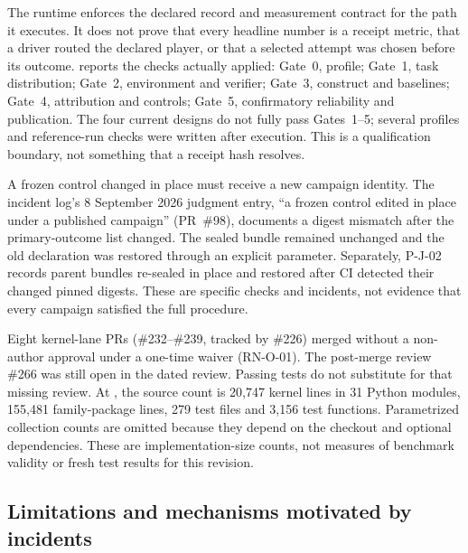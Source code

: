 The runtime enforces the declared record and measurement contract for
the path it executes. It does not prove that every headline number is
a receipt metric, that a driver routed the declared player, or that a
selected attempt was chosen before its outcome. \qcref{} reports the
checks actually applied: Gate~0, profile; Gate~1, task distribution;
Gate~2, environment and verifier; Gate~3, construct and baselines;
Gate~4, attribution and controls; Gate~5, confirmatory reliability and
publication. The four current designs do not fully pass Gates~1--5;
several profiles and reference-run checks were written after execution.
This is a qualification boundary, not something that a receipt hash
resolves.

A frozen control changed in place must receive a new campaign identity.
The incident log's 8 September 2026 judgment entry, ``a frozen control
edited in place under a published campaign'' (PR~\#98), documents a
digest mismatch after the primary-outcome list changed. The sealed
bundle remained unchanged and the old declaration was restored through
an explicit parameter. Separately, P-J-02 records parent bundles
re-sealed in place and restored after CI detected their changed pinned
digests. These are specific checks and incidents, not evidence that
every campaign satisfied the full procedure.

Eight kernel-lane PRs (\#232--\#239, tracked by \#226) merged without a
non-author approval under a one-time waiver (RN-O-01). The post-merge
review \#266 was still open in the dated review. Passing tests do not
substitute for that missing review. At , the source count
is 20,747 kernel lines in 31 Python modules, 155,481 family-package
lines, 279 test files and 3,156 test functions. Parametrized collection
counts are omitted because they depend on the checkout and optional
dependencies. These are implementation-size counts, not measures of
benchmark validity or fresh test results for this revision.

\subsection{Limitations and mechanisms motivated by incidents}
\label{app:runtime-limits}


